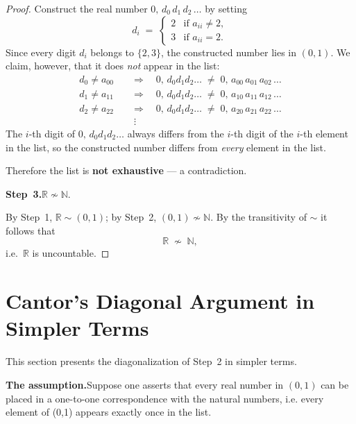 \documentclass[12pt]{article}
\theoremstyle{definition}
\theoremstyle{plain}
\theoremstyle{remark}
\newcommand{\N}{\mathbb{N}}
\newcommand{\R}{\mathbb{R}}
\begin{document}
\begin{proof}
Construct the real number $0{,}\,d_0\,d_1\,d_2\,\ldots$ by setting
\[
    d_i \;=\;
    \begin{cases}
        2 & \text{if } a_{ii} \neq 2,\\
        3 & \text{if } a_{ii} = 2.
    \end{cases}
\]
Since every digit $d_i$ belongs to $\{2,3\}$, the constructed number lies in $(0,1)$.
We claim, however, that it does \emph{not} appear in the list:
\begin{align*}
    d_0 \neq a_{00} \quad&\Longrightarrow\quad
    0{,}\,d_0d_1d_2\ldots \;\neq\; 0{,}\,a_{00}\,a_{01}\,a_{02}\,\ldots\\
    d_1 \neq a_{11} \quad&\Longrightarrow\quad
    0{,}\,d_0d_1d_2\ldots \;\neq\; 0{,}\,a_{10}\,a_{11}\,a_{12}\,\ldots\\
    d_2 \neq a_{22} \quad&\Longrightarrow\quad
    0{,}\,d_0d_1d_2\ldots \;\neq\; 0{,}\,a_{20}\,a_{21}\,a_{22}\,\ldots\\
    &\;\vdots
\end{align*}
The $i$-th digit of $0{,}\,d_0d_1d_2\ldots$ always differs from the $i$-th digit of
the $i$-th element in the list, so the constructed number differs from \emph{every}
element in the list.

Therefore the list is \textbf{not exhaustive} --- a contradiction.

\medskip
\noindent\textbf{Step~3.}\quad $\R \not\sim \N$.

\smallskip
By Step~1, $\R \sim (0,1)$; by Step~2, $(0,1)\not\sim\N$. By the transitivity
of $\sim$ it follows that
\[
    \R \;\not\sim\; \N,
\]
i.e.\ $\R$ is uncountable.
\end{proof}

\section{Cantor's Diagonal Argument in Simpler Terms}

This section presents the diagonalization of Step~2 in simpler terms.

\medskip
\noindent\textbf{The assumption.}\quad Suppose one asserts that every real number
in $(0,1)$ can be placed in a one-to-one correspondence with the natural numbers, i.e. every element of (0,1) appears exactly once in the list.
\end{document}
